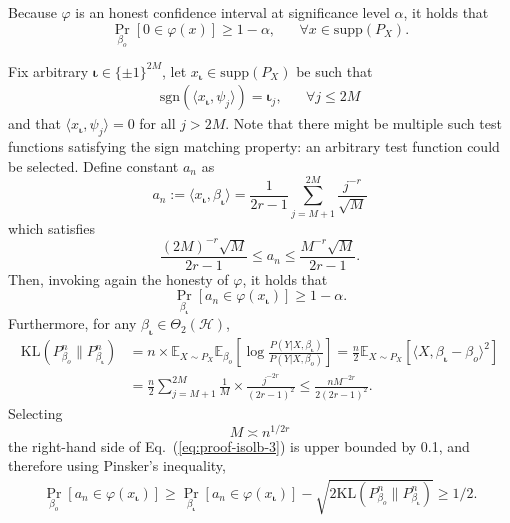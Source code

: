 \documentclass[aos]{imsart}
\newcommand{\vct}{\boldsymbol}
\newcommand{\supp}{\mathrm{supp}}
\newcommand{\mH}{\mathcal H}
\newcommand{\sgn}{\mathrm{sgn}}
\theoremstyle{plain}
\theoremstyle{definition}
\theoremstyle{definition}
\begin{document}
\begin{appendix}
Because $\varphi$ is an honest confidence interval at significance level $\alpha$, it holds that 
\begin{equation}
\Pr_{\beta_o}\left[0\in\varphi(x)\right] \geq 1-\alpha,\;\;\;\;\;\;\forall x\in\supp(P_X).
\label{eq:proof-isolb-1}
\end{equation}

Fix arbitrary $\vct\iota\in\{\pm 1\}^{2M}$, let $x_{\vct\iota}\in\supp(P_X)$ be such that 
\begin{align}
\sgn(\langle x_{\vct\iota},\psi_j\rangle)=\vct\iota_j,\;\;\;\;\;\;\forall j\leq 2M\label{eq:proof-isolb-xl}
\end{align}
and that $\langle x_{\vct\iota},\psi_j\rangle = 0$ for all $j>2M$.
Note that there might be multiple such test functions satisfying the sign matching property: an arbitrary test function could be selected.
Define constant $a_n$ as
$$
a_n := \langle x_{\vct\iota},\beta_{\vct\iota}\rangle = \frac{1}{2r-1}\sum_{j=M+1}^{2M}\frac{j^{-r}}{\sqrt{M}}
$$
which satisfies
\begin{equation}
\frac{(2M)^{-r}\sqrt{M}}{2r-1} \leq a_n \leq \frac{M^{-r}\sqrt{M}}{2r-1}.
\label{eq:proof-isolb-1half}
\end{equation}
Then, invoking again the honesty of $\varphi$, it holds that
\begin{equation}
\Pr_{\beta_{\vct\iota}}\left[a_n\in\varphi(x_{\vct\iota})\right] \geq 1-\alpha.
\label{eq:proof-isolb-2}
\end{equation}
Furthermore, for any $\beta_{\vct\iota}\in\Theta_2(\mH)$, 
\begin{align}
\mathrm{KL}(P_{\beta_o}^n\|P_{\beta_{\vct\iota}}^n) &= n\times \mathbb E_{X\sim P_X}\mathbb E_{\beta_o}\left[\log\frac{P(Y|X,\beta_{\vct\iota})}{P(Y|X,\beta_o)}\right]
= \frac{n}{2}\mathbb E_{X\sim P_X}[\langle X, \beta_{\vct\iota}-\beta_o\rangle^2]\nonumber\\
&= \frac{n}{2}\sum_{j=M+1}^{2M} \frac{1}{M}\times \frac{j^{-2r}}{(2r-1)^2} \leq \frac{nM^{-2r}}{2(2r-1)^2}.\label{eq:proof-isolb-3}
\end{align}
Selecting 
$$
M\asymp n^{1/2r}
$$
the right-hand side of Eq.~(\ref{eq:proof-isolb-3}) is upper bounded by 0.1, and therefore using Pinsker's inequality,
\begin{align}
{\Pr_{\beta_o}[a_n\in\varphi(x_{\vct\iota})]\geq \Pr_{\beta_{\vct\iota}}[a_n\in\varphi(x_{\vct\iota})] - \sqrt{2\mathrm{KL}(P_{\beta_o}^n\|P_{\beta_{\vct\iota}}^n)} \geq 1/2.}
\label{eq:proof-isolb-4}
\end{align}
{\color{magenta}
}
\end{appendix}
\end{document}
